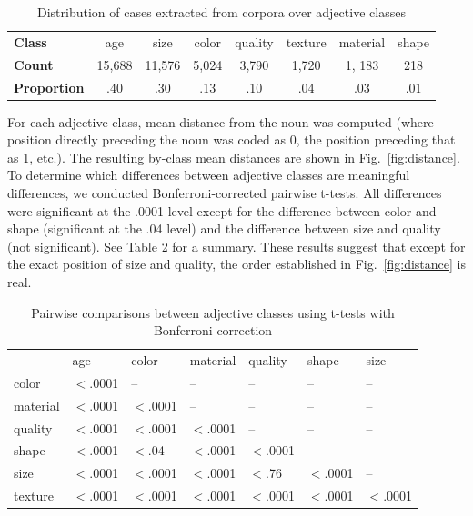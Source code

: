\documentclass{pnastwo}
\newcommand{\tableref}[1]{Table \ref{#1}}
\newcommand{\figref}[1]{Fig.~\ref{#1}}
\begin{document}
\begin{article}
\begin{materials}
\begin{table}
	\caption{Distribution of cases extracted from corpora over adjective classes}
	\begin{tabular}{l c c c c c c c}
	\textbf{Class} & age & size & color & quality & texture & material & shape \\
	\textbf{Count} & 15,688 & 11,576 & 5,024 & 3,790 & 1,720 & 1, 183 & 218 \\
	\textbf{Proportion} & .40 & .30 & .13 & .10 & .04 & .03 & .01
	\end{tabular}
\label{tab:adjdist}
\end{table}


For each adjective class, mean distance from the noun was computed (where position directly preceding the noun was coded as 0, the position preceding that as 1, etc.). The resulting by-class mean distances are shown in \figref{fig:distance}. To determine which differences between adjective classes are meaningful differences, we conducted Bonferroni-corrected pairwise t-tests. All differences were significant at the .0001 level except for the difference between color and shape (significant at the .04 level) and the difference between size and quality (not significant). See \tableref{tab:bonferronicorpus} for a summary. These results suggest that except for the exact position of size and quality, the order established in \figref{fig:distance} is real.

\begin{table}
\caption{Pairwise comparisons between adjective classes using t-tests with Bonferroni correction}

\begin{tabular}{l l l l l l l}
       &  age & color & material & quality & shape & size\\
color &     $<$.0001 &    --   &    --   &   -- &   --  & --\\
material &  $<$.0001 &  $<$.0001 &      --  &    -- &   -- &  --\\
quality &   $<$.0001 & $<$.0001 &         $<$.0001 &      --  &  -- &  --\\
shape &     $<$.0001 & $<$.04 &        $<$.0001 &  $<$.0001 &    -- &  --\\
size &      $<$.0001 & $<$.0001 &        $<$.0001 &  $<$.76 &    $<$.0001 &   --\\
texture &   $<$.0001 & $<$.0001 &       $<$.0001 &  $<$.0001 &    $<$.0001 &    $<$.0001
\end{tabular}
\label{tab:bonferronicorpus}
\end{table}


\end{materials}
\end{article}
\end{document}
